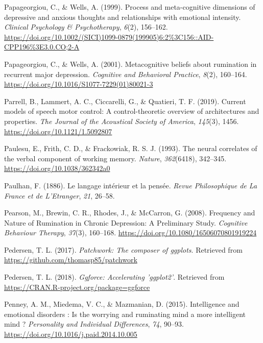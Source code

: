 \documentclass[a4paper,12pt,twoside,openright,oldfontcommands]{memoir}
\begin{document}
\leavevmode\hypertarget{ref-papageorgiou_process_1999}{}%
Papageorgiou, C., \& Wells, A. (1999). Process and meta-cognitive dimensions of depressive and anxious thoughts and relationships with emotional intensity. \emph{Clinical Psychology \& Psychotherapy}, \emph{6}(2), 156--162. \url{https://doi.org/10.1002/(SICI)1099-0879(199905)6:2\%3C156::AID-CPP196\%3E3.0.CO;2-A}

\leavevmode\hypertarget{ref-papageorgiou_metacognitive_2001}{}%
Papageorgiou, C., \& Wells, A. (2001). Metacognitive beliefs about rumination in recurrent major depression. \emph{Cognitive and Behavioral Practice}, \emph{8}(2), 160--164. \url{https://doi.org/10.1016/S1077-7229(01)80021-3}

\leavevmode\hypertarget{ref-parrell_current_2019}{}%
Parrell, B., Lammert, A. C., Ciccarelli, G., \& Quatieri, T. F. (2019). Current models of speech motor control: A control-theoretic overview of architectures and properties. \emph{The Journal of the Acoustical Society of America}, \emph{145}(3), 1456. \url{https://doi.org/10.1121/1.5092807}

\leavevmode\hypertarget{ref-paulesu_neural_1993}{}%
Paulesu, E., Frith, C. D., \& Frackowiak, R. S. J. (1993). The neural correlates of the verbal component of working memory. \emph{Nature}, \emph{362}(6418), 342--345. \url{https://doi.org/10.1038/362342a0}

\leavevmode\hypertarget{ref-paulhan_langage_1886}{}%
Paulhan, F. (1886). Le langage intérieur et la pensée. \emph{Revue Philosophique de La France et de L'Etranger}, \emph{21}, 26--58.

\leavevmode\hypertarget{ref-pearson_frequency_2008}{}%
Pearson, M., Brewin, C. R., Rhodes, J., \& McCarron, G. (2008). Frequency and Nature of Rumination in Chronic Depression: A Preliminary Study. \emph{Cognitive Behaviour Therapy}, \emph{37}(3), 160--168. \url{https://doi.org/10.1080/16506070801919224}

\leavevmode\hypertarget{ref-R-patchwork}{}%
Pedersen, T. L. (2017). \emph{Patchwork: The composer of ggplots}. Retrieved from \url{https://github.com/thomasp85/patchwork}

\leavevmode\hypertarget{ref-R-ggforce}{}%
Pedersen, T. L. (2018). \emph{Ggforce: Accelerating 'ggplot2'}. Retrieved from \url{https://CRAN.R-project.org/package=ggforce}

\leavevmode\hypertarget{ref-Penney2015}{}%
Penney, A. M., Miedema, V. C., \& Mazmanian, D. (2015). Intelligence and emotional disorders : Is the worrying and ruminating mind a more intelligent mind ? \emph{Personality and Individual Differences}, \emph{74}, 90--93. \url{https://doi.org/10.1016/j.paid.2014.10.005}
\end{document}
